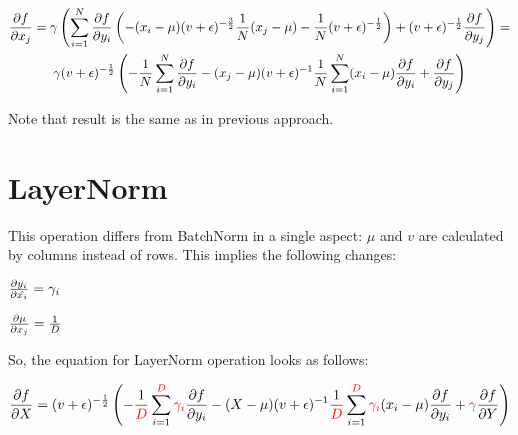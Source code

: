 \documentclass[12pt]{article}
\begin{document}
\begin{gather*}
\pdv{f}{x_j} = 
	\gamma 
	\left(
		\sum_{i=1}^{N} \pdv{f}{y_i} 
			\left( 
				- (x_i - \mu) (v + \epsilon)^{-\frac{3}{2}} \frac{1}{N} (x_j - \mu) - \frac{1}{N} (v + \epsilon)^{-\frac{1}{2}}
			\right) 
			+ (v + \epsilon)^{-\frac{1}{2}} \pdv{f}{y_j}
	\right) = \\
	\gamma (v + \epsilon)^{-\frac{1}{2}} 
	\left(	
		- \frac{1}{N} \sum_{i=1}^{N} \pdv{f}{y_i}
		- (x_j - \mu) (v + \epsilon)^{-1} \frac{1}{N} \sum_{i=1}^{N} (x_i - \mu) \pdv{f}{y_i} 
		+ \pdv{f}{y_j}
	\right)
\end{gather*}

Note that result is the same as in previous approach.

\section{LayerNorm}

This operation differs from BatchNorm in a single aspect: $\mu$ and $v$ are calculated by columns instead of rows. This implies the following changes:

$\pdv{y_i}{\hat{x_i}} = \gamma_i$

$\pdv{\mu}{x_j} = \frac{1}{D}$


So, the equation for LayerNorm operation looks as follows:

\[	
	\pdv{f}{X} = 
	(v + \epsilon)^{-\frac{1}{2}} 
	\left(	
		- \frac{1}{\begingroup\color{red} D \endgroup} 
		\sum_{i=1}^{\begingroup\color{red} D \endgroup} 
		\begingroup\color{red} \gamma_i \endgroup
		\pdv{f}{y_i}
		- (X - \mu) (v + \epsilon)^{-1} 
		\frac{1}{\begingroup\color{red} D \endgroup} 
		\sum_{i=1}^{\begingroup\color{red} D \endgroup} 
		\begingroup\color{red} \gamma_i \endgroup
		(x_i - \mu) \pdv{f}{y_i} 
		+ \begingroup\color{red} \gamma \endgroup \pdv{f}{Y}
	\right)
\]
\end{document}
